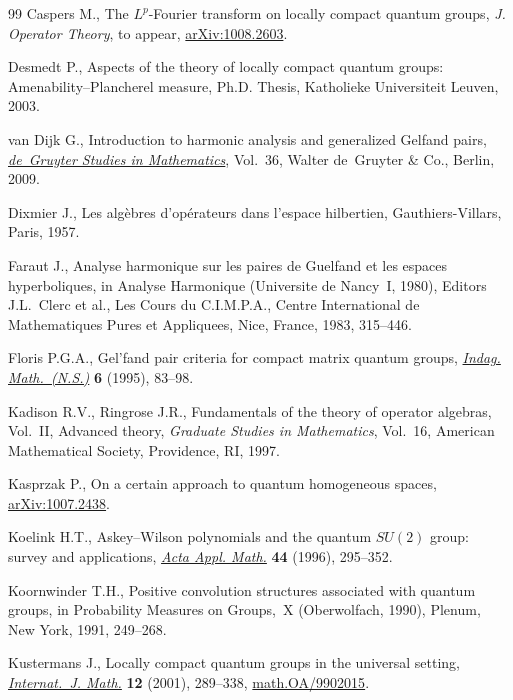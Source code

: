 \documentclass[11pt]{article}
\numberwithin{equation}{section}
\theoremstyle{definition}
\begin{document}
\begin{thebibliography}{99}
  Caspers M.,
  The $L^p$-Fourier transform on locally compact quantum groups,
 \emph{J. Operator Theory},   to appear,
\href{http://arxiv.org/abs/1008.2603}{arXiv:1008.2603}.

  Desmedt P.,
  Aspects of the theory of locally compact quantum groups: Amenability--Plancherel measure, Ph.D. Thesis,
  Katholieke Universiteit Leuven, 2003.

 van Dijk  G.,
  Introduction to harmonic analysis and generalized Gelfand pairs,
\href{http://dx.doi.org/10.1515/9783110220209}{{\it de~Gruyter Studies in Mathematics}}, Vol.~36, Walter de~Gruyter \& Co., Berlin, 2009.

 Dixmier  J.,
  Les alg\`ebres d'op\'erateurs dans l'espace hilbertien,
  Gauthiers-Villars, Paris, 1957.

  Faraut J.,
  Analyse harmonique sur les paires de Guelfand et les espaces hyperboliques,
in Analyse Harmonique (Universite de Nancy~I, 1980), Editors J.L.~Clerc et al., Les Cours du C.I.M.P.A., Centre International de Mathematiques Pures et Appliquees, Nice, France,
1983, 315--446.

  Floris P.G.A.,
  Gel'fand pair criteria for compact matrix quantum groups,
  \href{http://dx.doi.org/10.1016/0019-3577(95)98202-M}{\emph{Indag. Math.~(N.S.)}} {\bf 6} (1995), 83--98.

 Kadison R.V., Ringrose J.R.,
  Fundamentals of the theory of operator algebras, Vol.~II, Advanced theory,
  {\it Graduate Studies in Mathematics}, Vol.~16, American Mathematical Society, Providence, RI, 1997.

 Kasprzak  P.,
On a certain approach to quantum homogeneous spaces,
\href{http://arxiv.org/abs/1007.2438}{arXiv:1007.2438}.


Koelink  H.T.,
Askey--Wilson polynomials and the quantum $SU(2)$ group: survey and applications,
\href{http://dx.doi.org/10.1007/BF00047396}{\emph{Acta Appl. Math.}} {\bf 44} (1996), 295--352.

  Koornwinder T.H.,
Positive convolution structures associated with quantum groups,
 in Probability Measures on Groups,~X (Oberwolfach, 1990), Plenum, New York, 1991, 249--268.

  Kustermans  J.,
    Locally compact quantum groups in the universal setting,
\href{http://dx.doi.org/10.1142/S0129167X01000757}{\emph{Internat.~J. Math.}} {\bf 12} (2001), 289--338,
\href{http://arxiv.org/abs/math.OA/9902015}{math.OA/9902015}.



\end{thebibliography}
\end{document}
